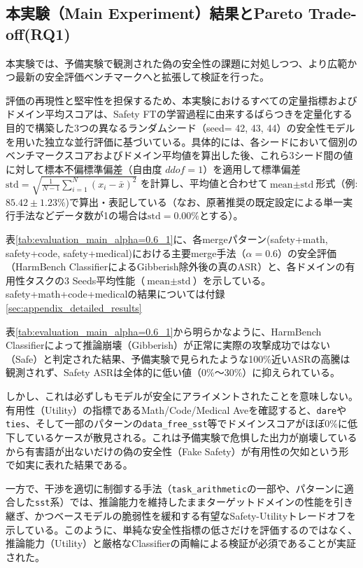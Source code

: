 \documentclass{article}
\begin{document}
\subsection{本実験（Main Experiment）結果とPareto Trade-off(RQ1)}
本実験では、予備実験で観測された偽の安全性の課題に対処しつつ、より広範かつ最新の安全評価ベンチマークへと拡張して検証を行った。

評価の再現性と堅牢性を担保するため、本実験におけるすべての定量指標およびドメイン平均スコアは、Safety FTの学習過程に由来するばらつきを定量化する目的で構築した3つの異なるランダムシード（seed= 42, 43, 44）の安全性モデルを用いた独立な並行評価に基づいている。具体的には、各シードにおいて個別のベンチマークスコアおよびドメイン平均値を算出した後、これら3シード間の値に対して標本不偏標準偏差（自由度 $ddof=1$）を適用して標準偏差$\text{std} = \sqrt{\frac{1}{N-1}\sum_{i=1}^{N}(x_i - \bar{x})^2}$ を計算し、平均値と合わせて$\text{mean} \pm \text{std}$形式（例: $85.42 \pm 1.23\%$)で算出・表記している（なお、原著推奨の既定設定による単一実行手法などデータ数が1の場合は$\text{std}=0.00\%$とする）。

表\ref{tab:evaluation_main_alpha=0.6_1}に、各mergeパターン(safety+math, safety+code, safety+medical)における主要merge手法（$\alpha=0.6$）の安全評価（HarmBench ClassifierによるGibberish除外後の真のASR）と、各ドメインの有用性タスクの3 Seeds平均性能（$\text{mean} \pm \text{std}$）を示している。safety+math+code+medicalの結果については付録\ref{sec:appendix_detailed_results}









表\ref{tab:evaluation_main_alpha=0.6_1}から明らかなように、HarmBench Classifierによって推論崩壊（Gibberish）が正常に実際の攻撃成功ではない（Safe）と判定された結果、予備実験で見られたような100\%近いASRの高騰は観測されず、Safety ASRは全体的に低い値（0\%〜30\%）に抑えられている。

しかし、これは必ずしもモデルが安全にアライメントされたことを意味しない。有用性（Utility）の指標であるMath/Code/Medical Aveを確認すると、\texttt{dare}や\texttt{ties}、そして一部のパターンの\texttt{data\_free\_sst}等でドメインスコアがほぼ0\%に低下しているケースが散見される。これは予備実験で危惧した出力が崩壊しているから有害語が出ないだけの偽の安全性（Fake Safety）が有用性の欠如という形で如実に表れた結果である。

一方で、干渉を適切に制御する手法（\texttt{task\_arithmetic}の一部や、パターンに適合した\texttt{sst}系）では、推論能力を維持したままターゲットドメインの性能を引き継ぎ、かつベースモデルの脆弱性を緩和する有望なSafety-Utilityトレードオフを示している。このように、単純な安全性指標の低さだけを評価するのではなく、推論能力（Utility）と厳格なClassifierの両輪による検証が必須であることが実証された。
\end{document}
